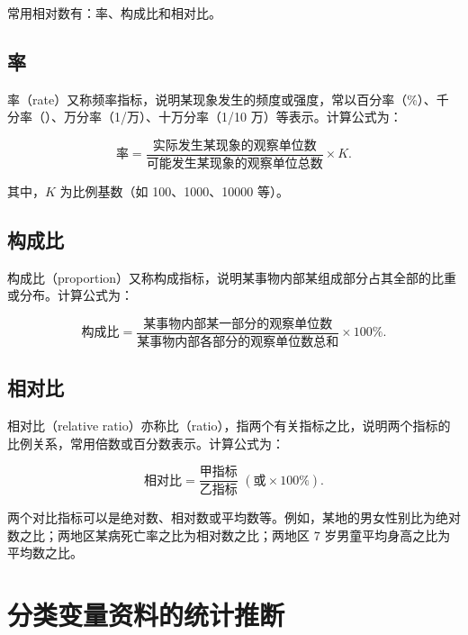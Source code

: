 \documentclass[lang=cn,10pt]{elegantbook}
\begin{document}
常用相对数有：率、构成比和相对比。

\section{率}

率（rate）又称频率指标，说明某现象发生的频度或强度，常以百分率（\%）、千分率（\textperthousand）、万分率（1/万）、十万分率（1/10 万）等表示。计算公式为：

\begin{equation}
  \text{率}=\frac{\text{实际发生某现象的观察单位数}}{\text{可能发生某现象的观察单位总数}}\times K.
\end{equation}

其中，$K$ 为比例基数（如 100、1000、10000 等）。

\section{构成比}

构成比（proportion）又称构成指标，说明某事物内部某组成部分占其全部的比重或分布。计算公式为：

\begin{equation}
  \text{构成比}=\frac{\text{某事物内部某一部分的观察单位数}}{\text{某事物内部各部分的观察单位数总和}}\times 100\%.
\end{equation}

\section{相对比}

相对比（relative ratio）亦称比（ratio），指两个有关指标之比，说明两个指标的比例关系，常用倍数或百分数表示。计算公式为：

\begin{equation}
  \text{相对比}=\frac{\text{甲指标}}{\text{乙指标}}\,\,(\text{或}\times 100\%).   
\end{equation}

两个对比指标可以是绝对数、相对数或平均数等。例如，某地的男女性别比为绝对数之比；两地区某病死亡率之比为相对数之比；两地区 7 岁男童平均身高之比为平均数之比。




\chapter{分类变量资料的统计推断}
\end{document}
